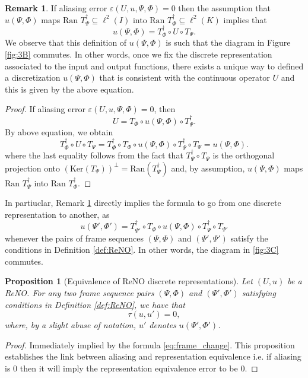 \documentclass[reqno,10pt]{amsart}
\theoremstyle{plain}
\newtheorem{prop}{Proposition}
\theoremstyle{definition}
\newtheorem{rem}{Remark}
\begin{document}
    \begin{rem} \label{rem:frame_change}
        If aliasing error $\varepsilon(U,u,\Psi,\Phi) = 0$ then the assumption that $u(\Psi,\Phi)$ maps $\text{Ran } T^\dag_\Psi \subseteq \ell^2(I)$ into $\text{Ran } T^\dag_\Phi \subseteq \ell^2(K)$ implies that 
        \begin{equation}
            u(\Psi,\Phi) = T^\dag_{\Phi} \circ U \circ T_\Psi.
        \end{equation}
        We observe that this definition of $u(\Psi,\Phi)$ is such that the diagram in Figure \ref{fig:3B} commutes. In other words, once we fix the discrete representation associated to the input and output functions, there exists a unique way to defined a discretization $u(\Psi,\Phi)$ that is consistent with the continuous operator $U$ and this is given by the above equation. 
        \begin{proof}
            If aliasing error $\varepsilon(U,u,\Psi,\Phi) = 0$, then
            \begin{equation}
                U = T_\Phi \circ u(\Psi,\Phi) \circ T^\dag_\Psi.
            \end{equation}
            By above equation, we obtain
            $$ T^\dag_\Phi \circ U \circ T_\Psi = T^\dag_\Phi \circ T_\Phi \circ u(\Psi,\Phi) \circ T^\dag_\Psi \circ T_\Psi = u(\Psi,\Phi).$$
            where the last equality follows from the fact that $T^\dag_\Psi \circ T_\Psi$ is the orthogonal projection onto $(\text{Ker}(T_\Psi))^{\perp} = \text{Ran}(T^\dag_\Psi)$ and, by assumption, $u(\Psi,\Phi)$ maps $\text{Ran }T^\dag_\Psi$ into $\text{Ran }T^\dag_\Phi$.
        \end{proof}
    \end{rem}

    \noindent In partiuclar, Remark \ref{rem:frame_change} directly implies the formula to go from one discrete representation to another, as
    \begin{equation} \label{eq:frame_change}
        u(\Psi',\Phi') = T^\dag_{\Psi'} \circ T_\Phi \circ u(\Psi,\Phi) \circ T^\dag_\Psi \circ T_{\Psi'}
    \end{equation}
    whenever the pairs of frame sequences $(\Psi,\Phi)$ and $(\Psi',\Psi')$ satisfy the conditions in Definition \ref{def:ReNO}. In other words, the diagram in \ref{fig:3C} commutes.

    \begin{prop}[Equivalence of ReNO discrete representations]
        Let $(U,u)$ be a ReNO. For any two frame sequence pairs $(\Psi,\Phi)$ and $(\Psi',\Phi')$ satisfying conditions in Definition \ref{def:ReNO}, we have that 
        $$ \tau(u,u') = 0,$$
        where, by a slight abuse of notation, $u'$ denotes $u(\Psi',\Phi')$.
    \end{prop}
    \begin{proof}
        Immediately implied by the formula \ref{eq:frame_change}. This proposition establishes the link between aliasing and representation equivalence i.e. if aliasing is $0$ then it will imply the representation equivalence error to be $0$.
    \end{proof}
\end{document}
